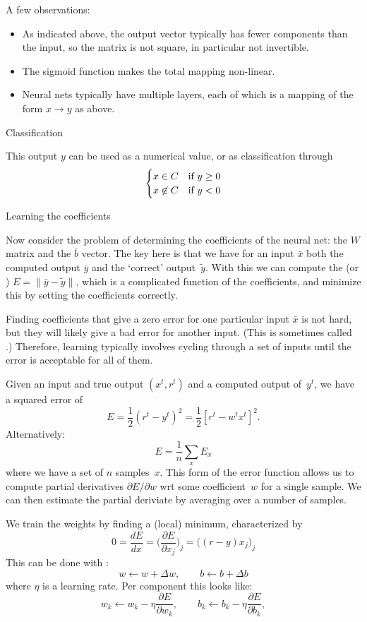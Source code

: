A few observations:
\begin{itemize}
\item
  As indicated above, the output vector typically has fewer components
  than the input, so the matrix is not square, in particular not
  invertible.
\item The sigmoid function makes the total mapping non-linear.
\item Neural nets typically have multiple layers, each of which is a
  mapping of the form $x\rightarrow y$ as above.
\end{itemize}

 {Classification}

This output $y$ can be used as a numerical value,
or as classification through
\[ 
\begin{cases}
  x\in C &\hbox{if $y\geq 0$}\\
  x\not\in C&\hbox{if $y<0$}\\
\end{cases}
\]

 {Learning the coefficients}

Now consider the problem of determining the coefficients of the neural
net: the $W$ matrix and the $\bar b$ vector. The key here is that we have
for an input $\bar x$ both the computed output $\bar y$ and the
`correct' output~$\tilde y$. With this we can compute the
 (or )
$E=\|\bar y -\tilde y\|$, which is a complicated function of the
coefficients, and minimize this by setting the coefficients correctly.

Finding coefficients that give a zero error for one particular input
$\bar x$ is not hard, but they will likely give a bad error for
another input. (This is sometimes called .)
Therefore, learning typically involves cycling through a set of inputs
until the error is acceptable for all of them.

Given an input and true output $(x^t,r^t)$ and a computed output
of~$y^t$, we have a squared error of
\[ E = \frac12 (r^t-y^t)^2 = \frac12 \left[r^t- w^tx^t\right]^2. \]
Alternatively:
\[ E = \frac1n \sum_x E_x \]
where we have a set of $n$ samples~$x$.
This form of the error function allows us to compute partial
derivatives $\partial E/\partial w$ wrt some coefficient~$w$
for a single sample. We can then estimate the partial deriviate by
averaging over a number of samples.

We train the weights
by finding a (local) minimum, characterized by
\[ 0=\frac{d E}{d x} = \bigl( \frac{\partial E}{\partial x_j} \bigr)_j
    = \bigl( (r-y)x_j \bigr)_j \]
This can be done with :
\[ w\leftarrow w+\Delta w, \qquad b\leftarrow b+\Delta b\]
where $\eta$ is a learning rate.
Per component this looks like:
\[ w_k \leftarrow w_k - \eta \frac{\partial E}{\partial w_k},
\qquad
b_k \leftarrow b_k - \eta \frac{\partial E}{\partial b_k},
\]

